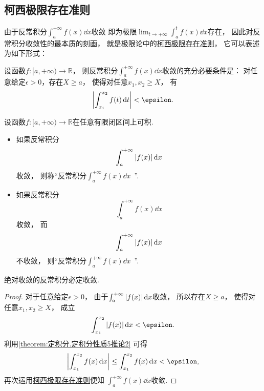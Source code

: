 \subsection{柯西极限存在准则}
由于反常积分\(\int_a^{+\infty} f(x) \dd{x}\)收敛
即为极限\(\lim_{t\to+\infty} \int_a^t f(x) \dd{x}\)存在，
因此对反常积分收敛性的最本质的刻画，
就是极限论中的\hyperref[theorem:极限.函数的柯西极限存在准则]{柯西极限存在准则}，
它可以表述为如下形式：
\begin{theorem}\label{theorem:反常积分.柯西极限存在准则}
设函数\(f\colon[a,+\infty)\to\mathbb{R}\)，
则反常积分\(\int_a^{+\infty} f(x) \dd{x}\)收敛的充分必要条件是：
对任意给定\(\epsilon>0\)，存在\(X \geq a\)，
使得对任意\(x_1,x_2 \geq X\)，
有\[
	\abs{\int_{x_1}^{x_2} f(t) \dd{t}} < \epsilon.
\]
\end{theorem}

\begin{definition}
设函数\(f\colon[a,+\infty)\to\mathbb{R}\)在任意有限闭区间上可积.
\begin{itemize}
	\item 如果反常积分\[
		\int_a^{+\infty} \abs{f(x)} \dd{x}
	\]收敛，
	则称“反常积分\(\int_a^{+\infty} f(x) \dd{x}\)~”.

	\item 如果反常积分\[
		\int_a^{+\infty} f(x) \dd{x}
	\]收敛，
	而\[
		\int_a^{+\infty} \abs{f(x)} \dd{x}
	\]不收敛，
	则“反常积分\(\int_a^{+\infty} f(x) \dd{x}\)~”.
\end{itemize}
\end{definition}

\begin{theorem}\label{theorem:定积分.绝对收敛的无穷限反常积分必收敛}
绝对收敛的反常积分必定收敛.
\begin{proof}
对于任意给定\(\epsilon>0\)，
由于\(\int_a^{+\infty} \abs{f(x)} \dd{x}\)收敛，
所以存在\(X \geq a\)，
使得对任意\(x_1,x_2 \geq X\)，
成立\[
	\int_{x_1}^{x_2} \abs{f(x)} \dd{x} < \epsilon.
\]
利用\cref{theorem:定积分.定积分性质5推论2} 可得\[
	\abs{\int_{x_1}^{x_2} f(x) \dd{x}}
	\leq \int_{x_1}^{x_2} f(x) \dd{x}
	< \epsilon,
\]
再次运用\hyperref[theorem:反常积分.柯西极限存在准则]{柯西极限存在准则}便知
\(\int_a^{+\infty} f(x) \dd{x}\)收敛.
\end{proof}
\end{theorem}


